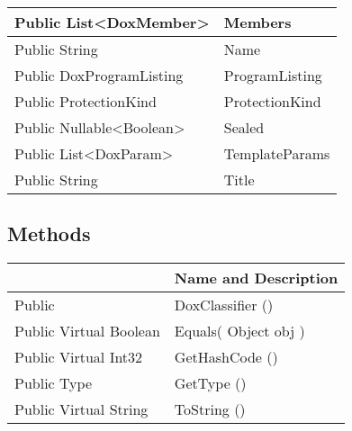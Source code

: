 \documentclass[11pt, oneside, a4paper]{book}
\begin{document}
\begin{center}
\begin{tabular}{| p{3cm} | p{12cm} | }
\hline
 Public  List<DoxMember> &  Members\hypertarget{SoftwareEngineeringTools.{}Documentation.{}DoxClassifier.{}Members}{}\\
\hline
 Public  String &  Name\hypertarget{SoftwareEngineeringTools.{}Documentation.{}DoxClassifier.{}Name}{}\\
\hline
 Public  DoxProgramListing &  ProgramListing\hypertarget{SoftwareEngineeringTools.{}Documentation.{}DoxClassifier.{}ProgramListing}{}\\
\hline
 Public  ProtectionKind &  ProtectionKind\hypertarget{SoftwareEngineeringTools.{}Documentation.{}DoxClassifier.{}ProtectionKind}{}\\
\hline
 Public  Nullable<Boolean> &  Sealed\hypertarget{SoftwareEngineeringTools.{}Documentation.{}DoxClassifier.{}Sealed}{}\\
\hline
 Public  List<DoxParam> &  TemplateParams\hypertarget{SoftwareEngineeringTools.{}Documentation.{}DoxClassifier.{}TemplateParams}{}\\
\hline
 Public  String &  Title\hypertarget{SoftwareEngineeringTools.{}Documentation.{}DoxClassifier.{}Title}{}\\
\hline
\end{tabular}
\end{center}

\subsection{Methods}
\begin{center}
\begin{tabular}{| p{3cm} | p{12cm} | }
\hline
\textbf{ } & \textbf{ Name and Description}\\
\hline
 Public  &  DoxClassifier ()\hypertarget{SoftwareEngineeringTools.{}Documentation.{}DoxClassifier.{}DoxClassifier}{}\\
\hline
 Public  Virtual  Boolean &  Equals(\hypertarget{SoftwareEngineeringTools.{}Documentation.{}DoxClassifier.{}Equals\_Object}{} Object  obj  )\\
\hline
 Public  Virtual  Int32 &  GetHashCode ()\hypertarget{SoftwareEngineeringTools.{}Documentation.{}DoxClassifier.{}GetHashCode}{}\\
\hline
 Public  Type &  GetType ()\hypertarget{SoftwareEngineeringTools.{}Documentation.{}DoxClassifier.{}GetType}{}\\
\hline
 Public  Virtual  String &  ToString ()\hypertarget{SoftwareEngineeringTools.{}Documentation.{}DoxClassifier.{}ToString}{}\\
\hline
\end{tabular}
\end{center}
 
\end{document}
